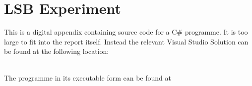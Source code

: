 \chapter{LSB Experiment}
\label{app:A}
This is a digital appendix containing source code for a C\# programme. It is too large to fit into the report itself.
Instead the relevant Visual Studio Solution can be found at the following location:

\setlength{\parindent}{0pt} {
\\

The programme in its executable form can be found at \\
}